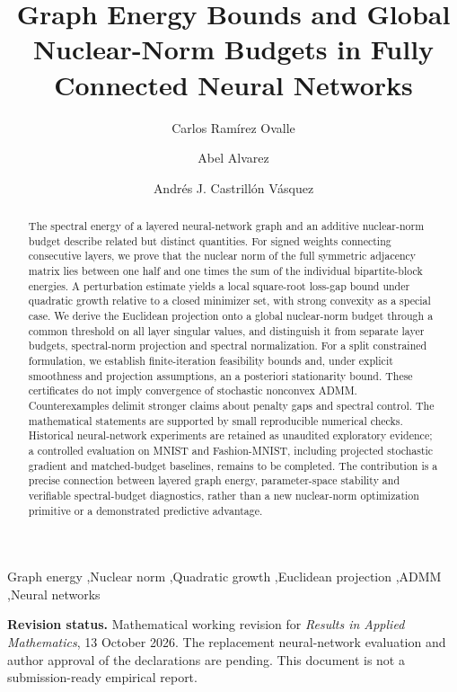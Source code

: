 \documentclass[a4paper,fleqn]{cas-sc}
\theoremstyle{remark}
\begin{document}
\let\WriteBookmarks\relax
{}
\title[mode=title]{Graph Energy Bounds and Global Nuclear-Norm Budgets in Fully Connected Neural Networks}
\author[1]{Carlos Ram\'irez Ovalle}
\cormark[1]
\author[1]{Abel Alvarez}
\author[1]{Andr\'es J. Castrill\'on V\'asquez}
\begin{abstract}
The spectral energy of a layered neural-network graph and an additive nuclear-norm budget describe related but distinct quantities. For signed weights connecting consecutive layers, we prove that the nuclear norm of the full symmetric adjacency matrix lies between one half and one times the sum of the individual bipartite-block energies. A perturbation estimate yields a local square-root loss-gap bound under quadratic growth relative to a closed minimizer set, with strong convexity as a special case. We derive the Euclidean projection onto a global nuclear-norm budget through a common threshold on all layer singular values, and distinguish it from separate layer budgets, spectral-norm projection and spectral normalization. For a split constrained formulation, we establish finite-iteration feasibility bounds and, under explicit smoothness and projection assumptions, an a posteriori stationarity bound. These certificates do not imply convergence of stochastic nonconvex ADMM. Counterexamples delimit stronger claims about penalty gaps and spectral control. The mathematical statements are supported by small reproducible numerical checks. Historical neural-network experiments are retained as unaudited exploratory evidence; a controlled evaluation on MNIST and Fashion-MNIST, including projected stochastic gradient and matched-budget baselines, remains to be completed. The contribution is a precise connection between layered graph energy, parameter-space stability and verifiable spectral-budget diagnostics, rather than a new nuclear-norm optimization primitive or a demonstrated predictive advantage.
\end{abstract}
\begin{keywords}
Graph energy \sep Nuclear norm \sep Quadratic growth \sep Euclidean projection \sep ADMM \sep Neural networks
\end{keywords}
\maketitle
\noindent\textbf{Revision status.} Mathematical working revision for \emph{Results in Applied Mathematics}, 13 October 2026. The replacement neural-network evaluation and author approval of the declarations are pending. This document is not a submission-ready empirical report.





\end{document}
